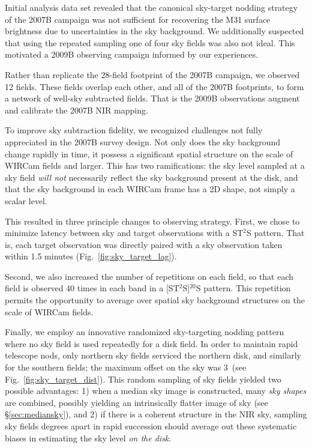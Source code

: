\documentclass[iop]{emulateapj}
\newcommand{\Fig}[1]{Fig.~\ref{fig:#1}}  %
\newcommand{\Sec}[1]{\S\ref{sec:#1}}  %
\begin{document}
Initial analysis data set revealed that the canonical sky-target nodding strategy of the 2007B campaign was not sufficient for recovering the M31 surface brightness due to uncertainties in the sky background.
We additionally suspected that using the repeated sampling one of four sky fields was also not ideal.
This motivated a 2009B observing campaign informed by our experiences.

Rather than replicate the 28-field footprint of the 2007B campaign, we observed 12 fields. These fields overlap each other, and all of the 2007B footprints, to form a network of well-sky subtracted fields. That is the 2009B observations augment and calibrate the 2007B NIR mapping.

To improve sky subtraction fidelity, we recognized challenges not fully appreciated in the 2007B survey design.
Not only does the sky background change rapidly in time, it possess a significant spatial structure on the scale of WIRCam fields and larger.
This has two ramifications: the sky level sampled at a sky field \emph{will not} necessarily reflect the sky background present at the disk, and that the sky background in each WIRCam frame has a 2D shape, not simply a scalar level.

This resulted in three principle changes to observing strategy. First, we chose to minimize latency between sky and target observations with a ST$^2$S pattern. That is, each target observation was directly paired with a sky observation taken within 1.5 minutes (\Fig{sky_target_lag}).

Second, we also increased the number of repetitions on each field, so that each field is observed 40 times in each band in a [ST$^2$S]$^{20}$S pattern. This repetition permits the opportunity to average over spatial sky background structures on the scale of WIRCam fields.

Finally, we employ an innovative randomized sky-targeting nodding pattern where no sky field is used repeatedly for a disk field.
In order to maintain rapid telescope nods, only northern sky fields serviced the northern disk, and similarly for the southern fields; the maximum offset on the sky was 3\arcdeg\ (see \Fig{sky_target_dist}).
This random sampling of sky fields yielded two possible advantages: 1) when a median sky image is constructed, many \emph{sky shapes} are combined, possibly yielding an intrinsically flatter image of sky (see \Sec{mediansky}), and 2) if there is a coherent structure in the NIR sky, sampling sky fields degrees apart in rapid succession should average out these systematic biases in estimating the sky level \emph{on the disk}.
\end{document}
